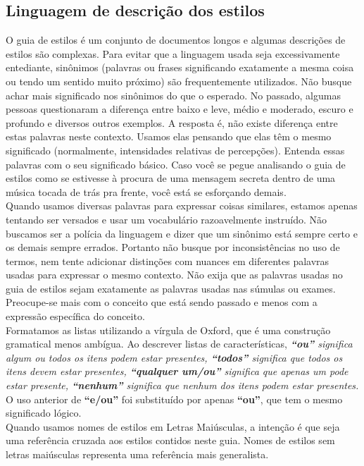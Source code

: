 \subsection*{Linguagem de descrição dos estilos}
O guia de estilos é um conjunto de documentos longos e algumas descrições de estilos são complexas. Para evitar que a linguagem usada seja excessivamente entediante, sinônimos (palavras ou frases significando exatamente a mesma coisa ou tendo um sentido muito próximo) são frequentemente utilizados. Não busque achar mais significado nos sinônimos do que o esperado. No passado, algumas pessoas questionaram a diferença entre baixo e leve, médio e moderado, escuro e profundo e diversos outros exemplos. A resposta é, não existe diferença entre estas palavras neste contexto. Usamos elas pensando que elas têm o mesmo significado (normalmente, intensidades relativas de percepções). Entenda essas palavras com o seu significado básico. Caso você se pegue analisando o guia de estilos como se estivesse à procura de uma mensagem secreta dentro de uma música tocada de trás pra frente, você está se esforçando demais.\\
Quando usamos diversas palavras para expressar coisas similares, estamos apenas tentando ser versados e usar um vocabulário razoavelmente instruído. Não buscamos ser a polícia da linguagem e dizer que um sinônimo está sempre certo e os demais sempre errados. Portanto não busque por inconsistências no uso de termos, nem tente adicionar distinções com nuances em diferentes palavras usadas para expressar o mesmo contexto. Não exija que as palavras usadas no guia de estilos sejam exatamente as palavras usadas nas súmulas ou exames. Preocupe-se mais com o conceito que está sendo passado e menos com a expressão específica do conceito.\\
Formatamos as listas utilizando a vírgula de Oxford, que é uma construção gramatical menos ambígua. Ao descrever listas de características, \textit{\textbf{“ou”} significa algum ou todos os itens podem estar presentes, \textbf{“todos”} significa que todos os itens devem estar presentes, \textbf{“qualquer um/ou”} significa que apenas um pode estar presente, \textbf{“nenhum”} significa que nenhum dos itens podem estar presentes.} O uso anterior de \textbf{“e/ou”} foi substituído por apenas \textbf{“ou”}, que tem o mesmo significado lógico.\\
Quando usamos nomes de estilos em Letras Maiúsculas, a intenção é que seja uma referência cruzada aos estilos contidos neste guia. Nomes de estilos sem letras maiúsculas representa uma referência mais generalista.\\
